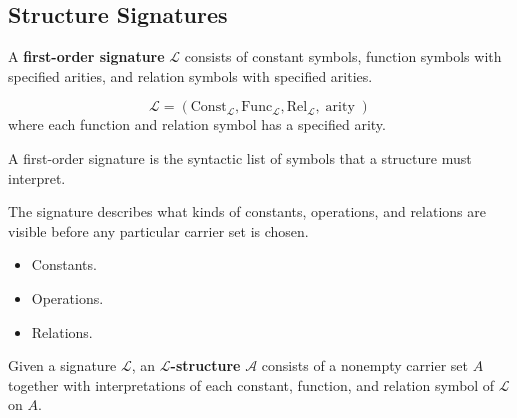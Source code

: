 \subsection{Structure Signatures}
\label{subsec:structure-signatures}

\begin{tcolorbox}[title={Definition --- First-Order Signature}]
\begin{definition}
\label{def:first-order-signature}
A \textbf{first-order signature} $\mathcal{L}$ consists of constant symbols,
function symbols with specified arities, and relation symbols with specified
arities.
\end{definition}
\end{tcolorbox}

\begin{remark*}
\[
\mathcal{L}=(\mathrm{Const}_{\mathcal{L}},
\mathrm{Func}_{\mathcal{L}},
\mathrm{Rel}_{\mathcal{L}},\operatorname{arity})
\]
where each function and relation symbol has a specified arity.
\end{remark*}

\begin{remark*}
A first-order signature is the syntactic list of symbols that a structure must
interpret.
\end{remark*}


\begin{remark*}[Interpretation]
The signature describes what kinds of constants, operations, and relations are
visible before any particular carrier set is chosen.
\end{remark*}

\begin{remark*}[Dependencies]
\begin{itemize}
  \item Constants.
  \item Operations.
  \item Relations.
\end{itemize}
\end{remark*}

\begin{tcolorbox}[title={Definition --- $\mathcal{L}$-Structure}]
\begin{definition}
\label{def:l-structure}
Given a signature $\mathcal{L}$, an \textbf{$\mathcal{L}$-structure}
$\mathcal{A}$ consists of a nonempty carrier set $A$ together with
interpretations of each constant, function, and relation symbol of
$\mathcal{L}$ on $A$.
\end{definition}
\end{tcolorbox}

